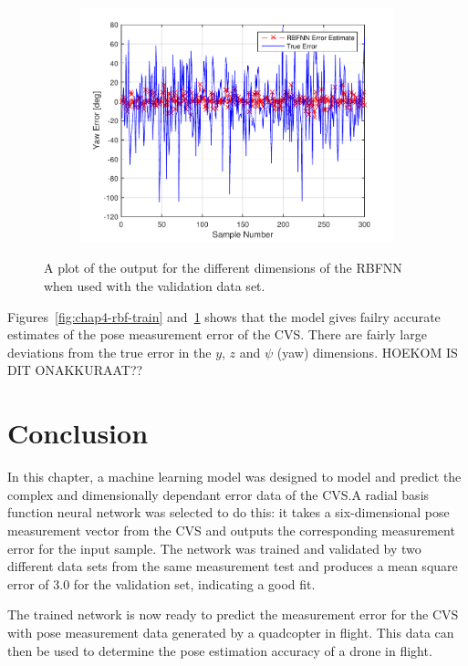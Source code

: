 \begin{figure}
\begin{subfigure}{0.3\textwidth}
    \caption{}
  \end{subfigure}
~
  \begin{subfigure}{0.3\textwidth}
    \includegraphics[width=\textwidth]{figures/chapter4/yaw_valid}
    \caption{}
  \end{subfigure}
  \caption[The output of the RBFNN with the validation set input.]{A plot of the output for the different dimensions of the RBFNN when used with the validation data set.}
  \label{fig:chap4-rbf-valid}
\end{figure}

Figures~\ref{fig:chap4-rbf-train} and~\ref{fig:chap4-rbf-valid} shows that the model gives failry accurate estimates of the pose measurement error of the CVS. There are fairly large deviations from the true error in the $y$, $z$ and $\psi$ (yaw) dimensions. HOEKOM IS DIT ONAKKURAAT??

\section{Conclusion}

In this chapter, a machine learning model was designed to model and predict the complex and dimensionally dependant error data of the CVS.\@ A radial basis function neural network was selected to do this: it takes a six-dimensional pose measurement vector from the CVS and outputs the corresponding measurement error for the input sample. The network was trained and validated by two different data sets from the same measurement test and produces a mean square error of 3.0 for the validation set, indicating a good fit. 

The trained network is now ready to predict the measurement error for the CVS with pose measurement data generated by a quadcopter in flight. This data can then be used to determine the pose estimation accuracy of a drone in flight. 
